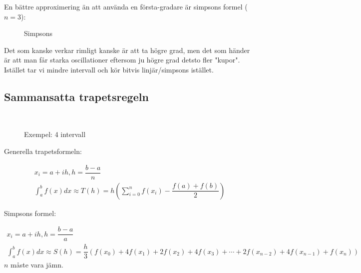 \noindent En bättre approximering än att använda en första-gradare är simpsons formel ($n=3$):

\begin{figure}[ht]
    \centering
    \caption{Simpsons}
    \label{fig:simpsons}
\end{figure}

\par\bigskip
\noindent Det som kanske verkar rimligt kanske är att ta högre grad, men det som händer är att man får starka oscillationer eftersom ju högre grad detsto fler "kupor". Istället tar vi mindre intervall och kör bitvis linjär/simpsons istället.

\subsection{Sammansatta trapetsregeln}\hfill\\
\begin{figure}[ht]
    \centering
    \caption{Exempel: 4 intervall}
    \label{fig:exempel:-4-intervall}
\end{figure}
\par\bigskip

\noindent Generella trapetsformeln:

\begin{equation*}
  \begin{gathered}
    x_i=a+ih, h=\dfrac{b-a}{n}\\
    \int_a^b f(x)dx \approx T(h)=h\left(\sum_{i=0}^n f(x_i) -\dfrac{f(a)+f(b)}{2}\right)
  \end{gathered}
\end{equation*}

\noindent Simpsons formel:


\begin{equation*}
  \begin{gathered}
    x_i=a+ih, h=\dfrac{b-a}{a}\\
    \int_a^b f(x)dx\approx S(h)=\dfrac{h}{3}\left(f(x_0)+4f(x_1)+2f(x_2)+4f(x_3)+\cdots+2f(x_{n-2})+4f(x_{n-1})+f(x_n)\right)
  \end{gathered}
\end{equation*}
\noindent $n$ måste vara jämn.












